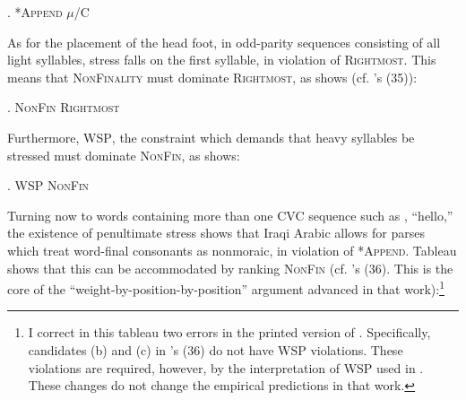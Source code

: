 \documentclass[12pt,twoside,letterpaper]{article}
\begin{document}
\ex. \textsc{*Append} \OTdom *$\mu$/\textsc{C}\\\begin{OTtableau}{2}
\end{OTtableau}

As for the placement of the head foot, in odd-parity sequences consisting of all light syllables, stress falls on the first syllable, in violation of \textsc{Rightmost}. This means that \textsc{NonFinality} must dominate \textsc{Rightmost}, as \Next shows (cf. \cite{rosenthall99}'s (35)):

\ex. \textsc{NonFin} \OTdom \textsc{Rightmost}\\
\begin{OTtableau}{2}
\end{OTtableau}

Furthermore, \textsc{WSP}, the constraint which demands that heavy syllables be stressed must dominate \textsc{NonFin}, as \Next shows:


\ex. \textsc{WSP} \OTdom \textsc{NonFin}\\\begin{OTtableau}{3}
\end{OTtableau}

Turning now to words containing more than one CVC sequence such as {\em {}}, ``hello,'' the existence of penultimate stress shows that Iraqi Arabic allows for parses which treat word-final consonants as nonmoraic, in violation of *\textsc{Append}. Tableau \Next shows that this can be accommodated by ranking \textsc{NonFin}  (cf. \cite{rosenthall99}'s (36). This is the core of the ``weight-by-position-by-position'' argument advanced in that work):\footnote{I correct in this tableau two errors in the printed version of \cite{rosenthall99}. Specifically, candidates (b) and (c) in \cite{rosenthall99}'s (36) do not have \textsc{WSP} violations. These violations are required, however, by the interpretation of \textsc{WSP} used in \Last. These changes do not change the empirical predictions in that work.}
\end{document}
